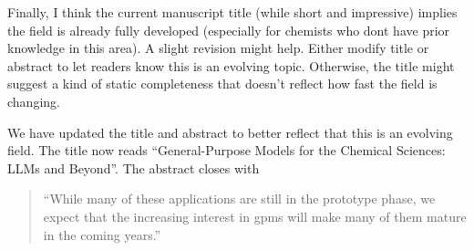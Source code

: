 \begin{point}
Finally, I think the current manuscript title (while short and impressive) implies the field is already fully developed (especially for chemists who dont have prior knowledge in this area). A slight revision might help. Either modify title or abstract to let readers know this is an evolving topic. Otherwise, the title might suggest a kind of static completeness that doesn't reflect how fast the field is changing.
\end{point}

\begin{reply}
We have updated the title and abstract to better reflect that this is an evolving field. 
The title now reads 
\enquote{General-Purpose Models for the Chemical Sciences:
LLMs and Beyond}. The abstract closes with 
\begin{quote}
    \enquote{While many of
these applications are still in the prototype phase, we expect that the increasing interest
in \glspl{gpm} will make many of them mature in the coming years.}
\end{quote}
\end{reply}
